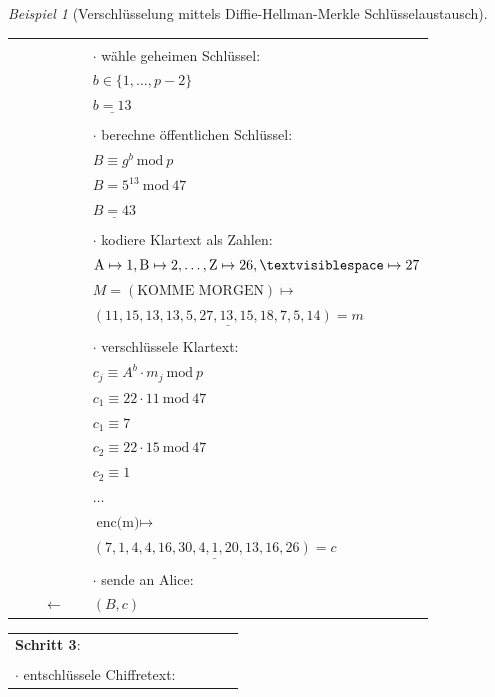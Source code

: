 \documentclass[
  a4paper,
  11pt,
]{scrartcl}
\theoremstyle{plain}
\theoremstyle{definition}
\theoremstyle{remark}
\newtheorem{beispiel}{Beispiel}
\newcommand{\Mod}[1]{\ \mathrm{mod}\ #1}
\begin{document}
\begin{beispiel}[Verschlüsselung mittels Diffie-Hellman-Merkle Schlüsselaustausch]
\begin{center}
\begin{tabularx}{\textwidth}{lXcXl}
      & & & & \\
      & & & & $\cdot$ wähle geheimen Schlüssel:\\
      & & & & $b \in \{1, \dots, p-2\}$\\
      & & & & $\underline{b=13}$\\
      & & & & \\
      & & & & $\cdot$ berechne öffentlichen Schlüssel:\\
      & & & & $B \equiv g^b \Mod{p}$\\
      & & & & $B = 5^{13} \Mod{47}$\\
      & & & & $\underline{B = 43}$\\
      & & & & \\
      & & & & $\cdot$ kodiere Klartext als Zahlen:\\
      & & & & $\text{A} \mapsto 1, \text{B} \mapsto 2, \ldots, \text{Z} \mapsto 26, \textvisiblespace \mapsto 27$\\
      & & & & $M =(\text{KOMME MORGEN}) \mapsto $\\
      & & & & $\underline{(11, 15, 13, 13, 5, 27, 13, 15, 18, 7, 5, 14) = m}$\\
      & & & & \\
      & & & & $\cdot$ verschlüssele Klartext:\\
      & & & & $c_j \equiv A^b \cdot m_j \Mod{p}$\\
      & & & & $c_1 \equiv 22 \cdot 11 \Mod{47}$\\
      & & & & $c_1 \equiv 7$\\
      & & & & $c_2 \equiv 22 \cdot 15 \Mod{47}$\\
      & & & & $c_2 \equiv 1$\\
      & & & & $\dots$\\
      & & & & $\text{enc(m)} \mapsto$\\
      & & & & $\underline{(7, 1, 4, 4, 16, 30, 4, 1, 20, 13, 16, 26) = c}$\\
      & & & & \\
      & & & & $\cdot$ sende an Alice:\\
      & & $\leftarrow$ & & $(B, c)$\\\midrule
    \end{tabularx}
    \begin{tabularx}{\textwidth}{lXcXl}
      \textbf{Schritt 3}: & & & & \\
      & & & & \\
      $\cdot$ entschlüssele Chiffretext: & & & & \\

\end{tabularx}
\end{center}
\end{beispiel}
\end{document}

